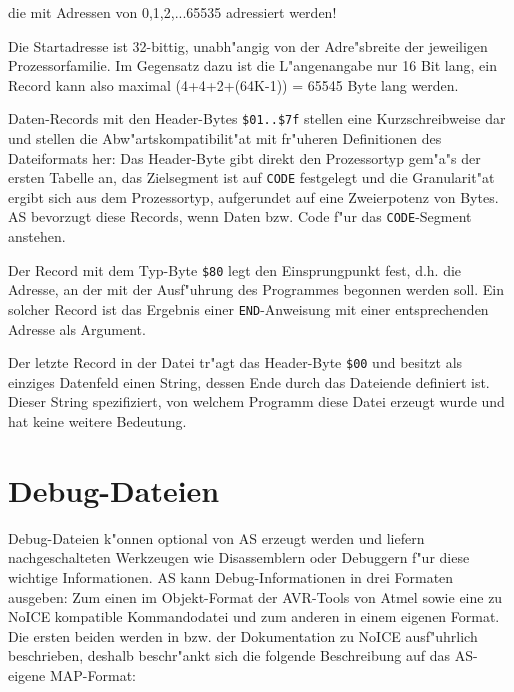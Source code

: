 \documentclass[12pt,a4paper,twoside]{report}
\newcommand{\tty}[1]{{\tt #1}}
\begin{document}
{die mit Adressen von 0,1,2,...65535 adressiert werden!
\par
Die Startadresse ist 32-bittig, unabh"angig von der Adre"sbreite der
jeweiligen Prozessorfamilie.  Im Gegensatz dazu ist die L"angenangabe
nur 16 Bit lang, ein Record kann also maximal (4+4+2+(64K-1)) = 65545
Byte lang werden.
\par
Daten-Records mit den Header-Bytes \verb!$01..$7f! stellen eine
Kurzschreibweise dar und stellen die Abw"artskompatibilit"at mit fr"uheren
Definitionen des Dateiformats her: Das Header-Byte gibt direkt den
Prozessortyp gem"a"s der ersten Tabelle an, das Zielsegment ist auf \tty{CODE}
festgelegt und die Granularit"at ergibt sich aus dem Prozessortyp,
aufgerundet auf eine Zweierpotenz von Bytes.  AS bevorzugt diese Records, 
wenn Daten bzw. Code f"ur das \tty{CODE}-Segment anstehen.
\par
Der Record mit dem Typ-Byte \verb!$80! legt den Einsprungpunkt fest, d.h.
die Adresse, an der mit der Ausf"uhrung des Programmes begonnen werden
soll.  Ein solcher Record ist das Ergebnis einer \tty{END}-Anweisung mit
einer entsprechenden Adresse als Argument.
\par
Der letzte Record in der Datei tr"agt das Header-Byte \verb!$00! und besitzt
als einziges Datenfeld einen String, dessen Ende durch das Dateiende
definiert ist.  Dieser String spezifiziert, von welchem Programm diese
Datei erzeugt wurde und hat keine weitere Bedeutung.


\section{Debug-Dateien}\label{SectDebugFormat}

Debug-Dateien k"onnen optional von AS erzeugt werden und liefern
nachgeschalteten Werkzeugen wie Disassemblern oder Debuggern f"ur diese
wichtige Informationen.  AS kann Debug-Informationen in drei Formaten
ausgeben: Zum einen im Objekt-Format der AVR-Tools von Atmel sowie eine zu
NoICE kompatible Kommandodatei und zum anderen in einem eigenen Format. 
Die ersten beiden werden in \cite{AVRObj} bzw. der Dokumentation zu
NoICE ausf"uhrlich beschrieben, deshalb beschr"ankt sich die folgende
Beschreibung auf das AS-eigene MAP-Format:

}
\end{document}
